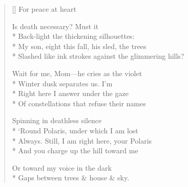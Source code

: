 \label{ch:snow_globe}
\settowidth{\versewidth}{Slashed like ink strokes against the glimmering hills?}
\begin{verse}[\versewidth]
\hspace{4\vgap} For peace at heart

Is death necessary?  Must it\\*
Back-light the thickening silhouettes:\\*
My son, eight this fall, his sled, the trees\\*
Slashed like ink strokes against the glimmering hills?

Wait for me, Mom---he cries as the violet\\*
Winter dusk separates us.  I'm \\*
Right here I answer   under the gaze\\*
Of constellations that refuse their names

Spinning in deathless silence\\*
`Round Polaris, under which I am lost\\*
Always.  Still, I am right here, your Polaris\\*
And you charge up the hill toward me

Or toward my voice in the dark\\*
Gaps between trees \& house \& sky.
\end{verse}
